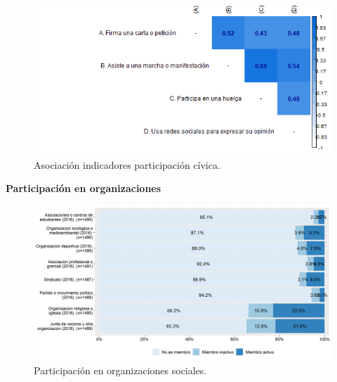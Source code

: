 \documentclass[
  12pt,
]{book}
\begin{document}
\begin{figure}[H]

{\centering \includegraphics[width=1\linewidth,height=1\textheight]{output/graphs/participacion-civica_cor} 

}

\caption{Asociación indicadores participación cívica.}\label{fig:participacion-civica-cor}
\end{figure}

\textbf{Participación en organizaciones}

\begin{figure}[H]

{\centering \includegraphics[width=1\linewidth,height=1\textheight]{output/graphs/participacion-organizaciones} 

}

\caption{Participación en organizaciones sociales.}\label{fig:participacion-organizaciones}
\end{figure}
\end{document}
